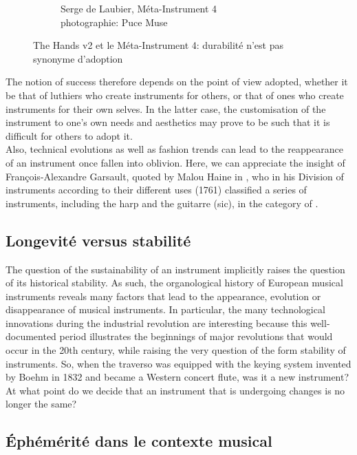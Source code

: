 \begin{figure}[!htbp]
{\begin{subfigure}[b]{.5\textwidth}
			\caption{Serge de Laubier, Méta-Instrument 4\\ photographie: Puce Muse}
			\label{fig:ephemeral:DeLaubier_MI4}
		\end{subfigure}%
	}
	\caption{The Hands v2 et le Méta-Instrument 4: durabilité n'est pas synonyme d'adoption}
\end{figure}

\indent The notion of success therefore depends on the point of view adopted, whether it be that of luthiers who create instruments for others, or that of ones who create instruments for their own selves. In the latter case, the customisation of the instrument to one's own needs and aesthetics may prove to be such that it is difficult for others to adopt it.\\
\indent Also, technical evolutions as well as fashion trends can lead to the reappearance of an instrument once fallen into oblivion. Here, we can appreciate the insight of François-Alexandre Garsault, quoted by Malou Haine in \cite{haine_les_2018}, who in his Division of instruments according to their different uses (1761) classified a series of instruments, including the harp and the guitarre (sic), in the category of .

\subsection{Longevité versus stabilité}
\label{sec:ephemeral:longevity_stability}
The question of the sustainability of an instrument implicitly raises the question of its historical stability. As such, the organological history of European musical instruments reveals many factors that lead to the appearance, evolution or disappearance of musical instruments. In particular, the many technological innovations during the industrial revolution are interesting because this well-documented period illustrates the beginnings of major revolutions that would occur in the 20th century, while raising the very question of the form stability of instruments. So, when the traverso was equipped with the keying system invented by Boehm in 1832 and became a Western concert flute, was it a new instrument? At what point do we decide that an instrument that is undergoing changes is no longer the same?

\subsection{Éphémérité dans le contexte musical}
